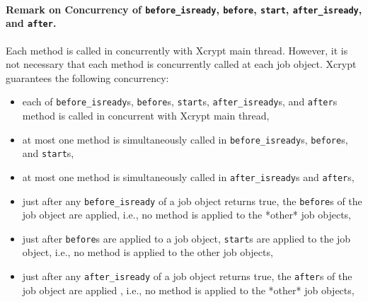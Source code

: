 \documentclass[a4paper,10pt]{report}
\begin{document}
\paragraph{Remark on Concurrency of \texttt{before\_isready}, \texttt{before}, \texttt{start}, \texttt{after\_isready}, and \texttt{after}.}
Each method is called in concurrently with Xcrypt main thread.
However, it is not necessary that each method is concurrently called
at each job object.  Xcrypt guarantees the following concurrency:
\begin{itemize}
  \item each of
	\texttt{before\_isready}s, \texttt{before}s, \texttt{start}s,
	\texttt{after\_isready}s, and \texttt{after}s
       method is called in concurrent with Xcrypt main thread,
  \item
    at most one method is simultaneously called in
	\texttt{before\_isready}s, \texttt{before}s, and
	\texttt{start}s,
  \item
    at most one method is simultaneously called in
	\texttt{after\_isready}s and \texttt{after}s,
  \item
       just after any \texttt{before\_isready} of a job object returns
	true, the \texttt{before}s of the job object are applied,
	i.e., no method is applied to the *other* job objects,
  \item
       just after \texttt{before}s are applied to a job object,
	\texttt{start}s are applied to the job object, i.e., no method
	is applied to the other job objects,
  \item
       just after any \texttt{after\_isready} of a job object returns
	true, the \texttt{after}s of the job object are applied ,
	i.e., no method is applied to the *other* job objects,
\end{itemize}
\fi
\end{document}

